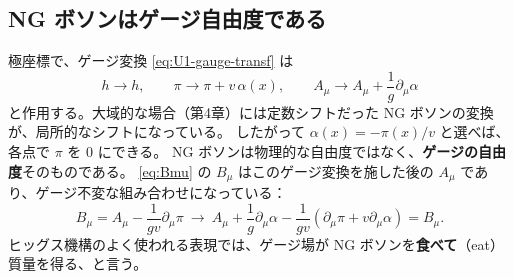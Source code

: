 \documentclass[uplatex,dvipdfmx,a4paper,11pt,openany]{jsbook}
\newcommand{\term}[2]{\textbf{#1}（#2）}
\numberwithin{equation}{chapter}
\theoremstyle{definition}
\theoremstyle{plain}
\theoremstyle{remark}
\begin{document}
\subsection{NG ボソンはゲージ自由度である}
極座標で、ゲージ変換 \eqref{eq:U1-gauge-transf} は
\begin{equation}
h\to h,\qquad \pi\to\pi+v\,\alpha(x),\qquad A_\mu\to A_\mu+\frac1g\partial_\mu\alpha
\end{equation}
と作用する。大域的な場合（第4章）には定数シフトだった NG ボソンの変換が、局所的なシフトになっている。
したがって $\alpha(x)=-\pi(x)/v$ と選べば、各点で $\pi$ を 0 にできる。
NG ボソンは物理的な自由度ではなく、\textbf{ゲージの自由度}そのものである。
\eqref{eq:Bmu} の $B_\mu$ はこのゲージ変換を施した後の $A_\mu$ であり、ゲージ不変な組み合わせになっている：
\begin{equation}
B_\mu=A_\mu-\frac{1}{gv}\partial_\mu\pi\ \to\ A_\mu+\frac1g\partial_\mu\alpha-\frac{1}{gv}(\partial_\mu\pi+v\partial_\mu\alpha)=B_\mu .
\end{equation}
ヒッグス機構のよく使われる表現では、ゲージ場が NG ボソンを\term{食べて}{eat}質量を得る、と言う。
\end{document}
